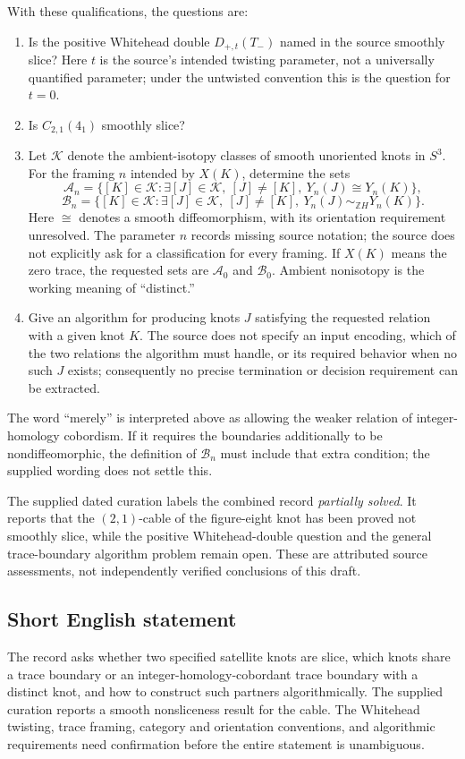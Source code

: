 \documentclass[11pt]{article}
\newcommand{\Z}{\mathbb{Z}}
\begin{document}
With these qualifications, the questions are:
\begin{enumerate}
\item Is the positive Whitehead double \(D_{+,t}(T_-)\) named in the source smoothly slice? Here \(t\) is the source's intended twisting parameter, not a universally quantified parameter; under the untwisted convention this is the question for \(t=0\).
\item Is \(C_{2,1}(4_1)\) smoothly slice?
\item Let \(\mathcal K\) denote the ambient-isotopy classes of smooth unoriented knots in \(S^3\). For the framing \(n\) intended by \(X(K)\), determine the sets
\[
\mathcal A_n=\bigl\{[K]\in\mathcal K:\exists[J]\in\mathcal K,\ [J]\neq[K],\ Y_n(J)\cong Y_n(K)\bigr\},
\]
\[
\mathcal B_n=\bigl\{[K]\in\mathcal K:\exists[J]\in\mathcal K,\ [J]\neq[K],\ Y_n(J)\sim_{\Z H}Y_n(K)\bigr\}.
\]
Here \(\cong\) denotes a smooth diffeomorphism, with its orientation requirement unresolved. The parameter \(n\) records missing source notation; the source does not explicitly ask for a classification for every framing. If \(X(K)\) means the zero trace, the requested sets are \(\mathcal A_0\) and \(\mathcal B_0\). Ambient nonisotopy is the working meaning of ``distinct.''
\item Give an algorithm for producing knots \(J\) satisfying the requested relation with a given knot \(K\). The source does not specify an input encoding, which of the two relations the algorithm must handle, or its required behavior when no such \(J\) exists; consequently no precise termination or decision requirement can be extracted.
\end{enumerate}
The word ``merely'' is interpreted above as allowing the weaker relation of integer-homology cobordism. If it requires the boundaries additionally to be nondiffeomorphic, the definition of \(\mathcal B_n\) must include that extra condition; the supplied wording does not settle this.

The supplied dated curation labels the combined record \emph{partially solved}. It reports that the \((2,1)\)-cable of the figure-eight knot has been proved not smoothly slice, while the positive Whitehead-double question and the general trace-boundary algorithm problem remain open. These are attributed source assessments, not independently verified conclusions of this draft.
\subsection{Short English statement}
The record asks whether two specified satellite knots are slice, which knots share a trace boundary or an integer-homology-cobordant trace boundary with a distinct knot, and how to construct such partners algorithmically. The supplied curation reports a smooth nonsliceness result for the cable. The Whitehead twisting, trace framing, category and orientation conventions, and algorithmic requirements need confirmation before the entire statement is unambiguous.
\end{document}
